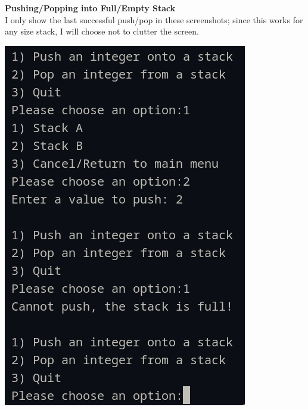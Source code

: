 \documentclass{article}
\begin{document}
\pagebreak
\begin{center}
    \Large\textbf{Pushing/Popping into Full/Empty Stack} \\ \normalsize
    I only show the last successful push/pop in these screenshots; since this works for any size stack, I will choose not to clutter the screen.
\end{center}
\begin{multicols}{2}
    \begin{center}
    \includegraphics[width=0.8\linewidth]{./res/2a.png}
    \end{center}

    \columnbreak


\end{multicols}
\end{document}

